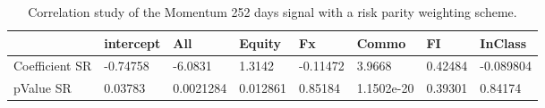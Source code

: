 \begin{table}[H]
\centering
\begin{tabular}{llllllll}
& intercept & All & Equity & Fx & Commo & FI & InClass \\ 
\hline 
Coefficient SR & -0.74758 & -6.0831 & 1.3142 & -0.11472 & 3.9668 & 0.42484 & -0.089804 \\ 
pValue SR & 0.03783 & 0.0021284 & 0.012861 & 0.85184 & 1.1502e-20 & 0.39301 & 0.84174 \\ 
\hline
\end{tabular}
\caption{Correlation study of the Momentum 252 days signal with a risk parity weighting scheme.}
\label{MOM252RP_CORR}
\end{table}